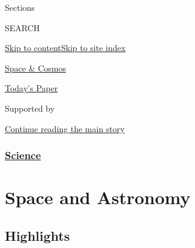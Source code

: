 Sections

SEARCH

\protect\hyperlink{site-content}{Skip to
content}\protect\hyperlink{site-index}{Skip to site index}

\href{https://www.nytimes.com/section/science/space}{Space \& Cosmos}

\href{https://myaccount.nytimes.com/auth/login?response_type=cookie\&client_id=vi}{}

\href{https://www.nytimes.com/section/todayspaper}{Today's Paper}

Supported by

\protect\hyperlink{after-sponsor}{Continue reading the main story}

\hypertarget{science}{%
\subsubsection{\texorpdfstring{\href{/section/science}{Science}}{Science}}\label{science}}

\hypertarget{space-and-astronomy}{%
\section{Space and Astronomy}\label{space-and-astronomy}}

\hypertarget{highlights}{%
\subsection{Highlights}\label{highlights}}

